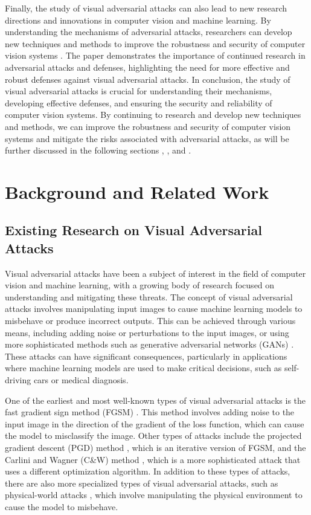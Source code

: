 \documentclass[11pt]{article}
\begin{document}
Finally, the study of visual adversarial attacks can also lead to new research directions and innovations in computer vision and machine learning. By understanding the mechanisms of adversarial attacks, researchers can develop new techniques and methods to improve the robustness and security of computer vision systems \cite{ref18}. The \cite{ref19} paper demonstrates the importance of continued research in adversarial attacks and defenses, highlighting the need for more effective and robust defenses against visual adversarial attacks. In conclusion, the study of visual adversarial attacks is crucial for understanding their mechanisms, developing effective defenses, and ensuring the security and reliability of computer vision systems. By continuing to research and develop new techniques and methods, we can improve the robustness and security of computer vision systems and mitigate the risks associated with adversarial attacks, as will be further discussed in the following sections \cite{ref20}, \cite{ref21}, and \cite{ref22}.

\section{Background and Related Work}

\subsection{Existing Research on Visual Adversarial Attacks}

Visual adversarial attacks have been a subject of interest in the field of computer vision and machine learning, with a growing body of research focused on understanding and mitigating these threats. The concept of visual adversarial attacks involves manipulating input images to cause machine learning models to misbehave or produce incorrect outputs. This can be achieved through various means, including adding noise or perturbations to the input images, or using more sophisticated methods such as generative adversarial networks (GANs) \cite{ref23}. These attacks can have significant consequences, particularly in applications where machine learning models are used to make critical decisions, such as self-driving cars or medical diagnosis.

One of the earliest and most well-known types of visual adversarial attacks is the fast gradient sign method (FGSM) \cite{ref8}. This method involves adding noise to the input image in the direction of the gradient of the loss function, which can cause the model to misclassify the image. Other types of attacks include the projected gradient descent (PGD) method \cite{ref8}, which is an iterative version of FGSM, and the Carlini and Wagner (C\&W) method \cite{ref8}, which is a more sophisticated attack that uses a different optimization algorithm. In addition to these types of attacks, there are also more specialized types of visual adversarial attacks, such as physical-world attacks \cite{ref7}, which involve manipulating the physical environment to cause the model to misbehave.
\end{document}
